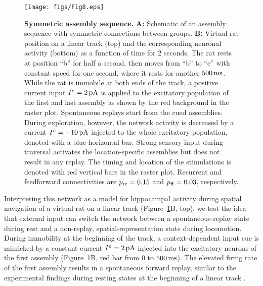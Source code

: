     \begin{figure}[!h]
      \center
      \texttt{[image: figs/Fig8.eps]}
      \caption{{\bf Symmetric assembly sequence.}
        \textbf{A:} Schematic of an assembly sequence with symmetric connections
        between groups.
        \textbf{B:} Virtual rat position on a linear track (top) and the
        corresponding neuronal activity (bottom) as a function of time for 2
        seconds. The rat rests at position ``b'' for half a second, then moves
        from ``b'' to ``e'' with constant speed for one second, where it rests
        for another $500 \, \rm ms$. While the rat is immobile at both ends of
        the track, a positive current input $I^e=2 \,\rm pA$ is applied to the
        excitatory population of the first and last assembly as shown by the
        red background in the raster plot. Spontaneous replays start from the
        cued assemblies. During exploration, however, the network activity is
        decreased by a current $I^e=-10 \,\rm pA$ injected to the whole
        excitatory population, denoted with a blue horizontal bar. Strong
        sensory input during traversal activates the location-specific
        assemblies but does not result in any replay. The timing and location
        of the stimulations is denoted with red vertical bars in the raster
        plot.  Recurrent and feedforward connectivities are $p_{\rm rc}=0.15$
        and $p_{\rm  ff}=0.03$, respectively.
      }
    \label{fig8}
    \end{figure}

    Interpreting this network as a model for hippocampal activity during spatial
    navigation of a virtual rat on a linear track (Figure~\ref{fig8}B,
    top), we test the idea that external input can switch the network between a
    spontaneous-replay state during rest and a non-replay, spatial-representation
    state during locomotion. During immobility at the beginning of the track, a
    context-dependent input cue is mimicked by a constant current $I^e=2 \, \rm
    pA$ injected into the excitatory neurons of the first assembly
    (Figure~\ref{fig8}B, red bar from 0 to $500 \, \rm ms$). The elevated
    firing rate of the first assembly results in a spontaneous forward replay,
    similar to the experimental findings during resting states at the beginning
    of a linear track \citep{Foster2006, Diba2007}.

